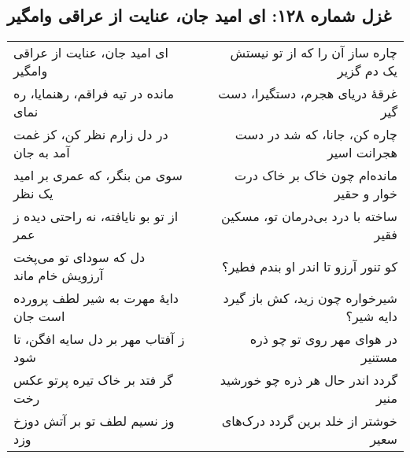 \begin{center}
\section*{غزل شماره ۱۲۸: ای امید جان، عنایت از عراقی وامگیر}
\label{sec:128}
\begin{longtable}{l p{0.5cm} r}
ای امید جان، عنایت از عراقی وامگیر
&&
چاره ساز آن را که از تو نیستش یک دم گزیر
\\
مانده در تیه فراقم، رهنمایا، ره نمای
&&
غرقهٔ دریای هجرم، دستگیرا، دست گیر
\\
در دل زارم نظر کن، کز غمت آمد به جان
&&
چاره کن، جانا، که شد در دست هجرانت اسیر
\\
سوی من بنگر، که عمری بر امید یک نظر
&&
مانده‌ام چون خاک بر خاک درت خوار و حقیر
\\
از تو بو نایافته، نه راحتی دیده ز عمر
&&
ساخته با درد بی‌درمان تو، مسکین فقیر
\\
دل که سودای تو می‌پخت آرزویش خام ماند
&&
کو تنور آرزو تا اندر او بندم فطیر؟
\\
دایهٔ مهرت به شیر لطف پرورده است جان
&&
شیرخواره چون زید، کش باز گیرد دایه شیر؟
\\
ز آفتاب مهر بر دل سایه افگن، تا شود
&&
در هوای مهر روی تو چو ذره مستنیر
\\
گر فتد بر خاک تیره پرتو عکس رخت
&&
گردد اندر حال هر ذره چو خورشید منیر
\\
وز نسیم لطف تو بر آتش دوزخ وزد
&&
خوشتر از خلد برین گردد درک‌های سعیر
\\
\end{longtable}
\end{center}
